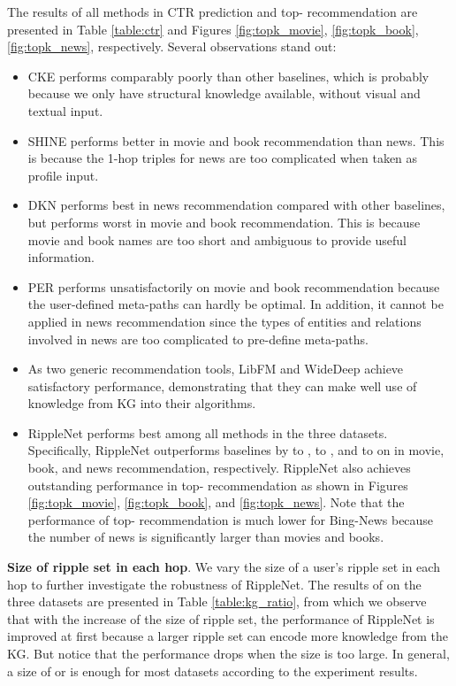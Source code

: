 \documentclass[sigconf]{acmart}
\begin{document}
        The results of all methods in CTR prediction and top- recommendation are presented in Table \ref{table:ctr} and Figures \ref{fig:topk_movie}, \ref{fig:topk_book}, \ref{fig:topk_news}, respectively.
        Several observations stand out:
        \begin{itemize}
        	\item
        		CKE performs comparably poorly than other baselines, which is probably because we only have structural knowledge available, without visual and textual input.
        	\item
        		SHINE performs better in movie and book recommendation than news.
        		This is because the 1-hop triples for news are too complicated when taken as profile input.
        	\item
        		DKN performs best in news recommendation compared with other baselines, but performs worst in movie and book recommendation.
        		This is because movie and book names are too short and ambiguous to provide useful information.
        	\item
        		PER performs unsatisfactorily on movie and book recommendation because the user-defined meta-paths can hardly be optimal.
        		In addition, it cannot be applied in news recommendation since the types of entities and relations involved in news are too complicated to pre-define meta-paths.
        	\item
        		As two generic recommendation tools, LibFM and WideDeep achieve satisfactory performance, demonstrating that they can make well use of knowledge from KG into their algorithms.
        	\item
        		RippleNet performs best among all methods in the three datasets.
        		Specifically, RippleNet outperforms baselines by  to ,  to , and  to  on  in movie, book, and news recommendation, respectively.
        		RippleNet also achieves outstanding performance in top- recommendation as shown in Figures \ref{fig:topk_movie}, \ref{fig:topk_book}, and \ref{fig:topk_news}.
        		Note that the performance of top- recommendation is much lower for Bing-News because the number of news is significantly larger than movies and books.
        \end{itemize}
        
        \noindent \textbf{Size of ripple set in each hop}.
        We vary the size of a user's ripple set in each hop to further investigate the robustness of RippleNet.
        The results of  on the three datasets are presented in Table \ref{table:kg_ratio}, from which we observe that with the increase of the size of ripple set, the performance of RippleNet is improved at first because a larger ripple set can encode more knowledge from the KG.
        But notice that the performance drops when the size is too large.
        In general, a size of  or  is enough for most datasets according to the experiment results.
        
\end{document}
